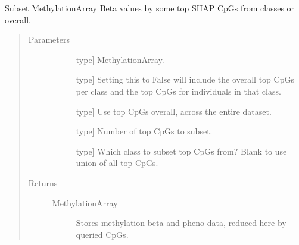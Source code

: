 \documentclass[letterpaper,10pt,english]{sphinxmanual}
\begin{document}
\begin{fulllineitems}
\begin{fulllineitems}
\end{fulllineitems}


\begin{fulllineitems}
\label{\detokenize{index:methylnet.interpretation_classes.ShapleyDataExplorer.extract_methylation_array}}
Subset MethylationArray Beta values by some top SHAP CpGs from classes or overall.
\begin{quote}\begin{description}
\item[{Parameters}] \leavevmode\begin{description}
\item[{}] \leavevmode{[}type{]}
MethylationArray.

\item[{}] \leavevmode{[}type{]}
Setting this to False will include the overall top CpGs per class and the top CpGs for individuals in that class.

\item[{}] \leavevmode{[}type{]}
Use top CpGs overall, across the entire dataset.

\item[{}] \leavevmode{[}type{]}
Number of top CpGs to subset.

\item[{}] \leavevmode{[}type{]}
Which class to subset top CpGs from? Blank to use union of all top CpGs.

\end{description}

\item[{Returns}] \leavevmode\begin{description}
\item[{MethylationArray}] \leavevmode
Stores methylation beta and pheno data, reduced here by queried CpGs.

\end{description}


\end{description}
\end{quote}
\end{fulllineitems}
\end{fulllineitems}
\end{document}
